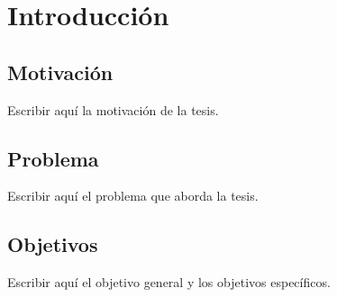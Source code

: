 \chapter{Introducción}

\section{Motivación}

Escribir aquí la motivación de la tesis.

\section{Problema}

Escribir aquí el problema que aborda la tesis.

\section{Objetivos}

Escribir aquí el objetivo general y los objetivos específicos.
